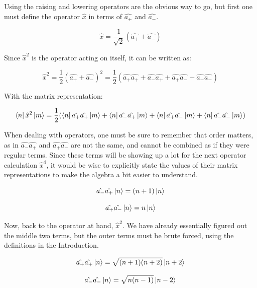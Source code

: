 \documentclass[12pt]{article}
\begin{document}
Using the raising and lowering operators are the obvious way to go, but first one must define the operator $\hat{x}$ in terms of $\hat{a_+}$ and $\hat{a_-}$.

\begin{equation}
\hat{x} = \frac{1}{\sqrt{2}} ( \hat{a_+} + \hat{a_-} )
\end{equation}

Since $\hat{x}^2$ is the operator acting on itself, it can be written as:

\begin{equation}
\hat{x}^2 = \frac{1}{2}  ( \hat{a_+} + \hat{a_-} )^2 = \frac{1}{2} ( \hat{a_+} \hat{a_+} + \hat{a_-} \hat{a_+} + \hat{a_+} \hat{a_-} + \hat{a_-} \hat{a_-} )
\end{equation}

With the matrix representation:

\begin{equation}
\bra{n} \hat{x}^2 \ket{m}= \frac{1}{2} ( \bra{n}\hat{a_+} \hat{a_+}\ket{m} + \bra{n}\hat{a_-} \hat{a_+}\ket{m} + \bra{n}\hat{a_+} \hat{a_-}\ket{m} + \bra{n}\hat{a_-} \hat{a_-} \ket{m})
\end{equation}

When dealing with operators, one must be sure to remember that order matters, as in $\hat{a_-} \hat{a_+}$ and $\hat{a_+} \hat{a_-}$ are not the same, and cannot be combined as if they were regular terms. Since these terms will be showing up a lot for the next operator calculation $\hat{x}^4$, it would be wise to explicitly state the values of their matrix representations to make the algebra a bit easier to understand. 

\begin{equation}
\hat{a_-} \hat{a_+} \ket{n} = (n+1) \ket{n}
\end{equation}

\begin{equation}
\hat{a_+} \hat{a_-} \ket{n} = n \ket{n}
\end{equation}

Now, back to the operator at hand, $\hat{x}^2$. We have already essentially figured out the middle two terms, but the outer terms must be brute forced, using the definitions in the Introduction.

\begin{equation}
\hat{a_+} \hat{a_+} \ket{n} =  \sqrt{(n+1)(n+2)} \ket{n+2}
\end{equation}

\begin{equation}
\hat{a_-} \hat{a_-} \ket{n} = \sqrt{n ( n- 1)} \ket{n-2}
\end{equation}
\end{document}
